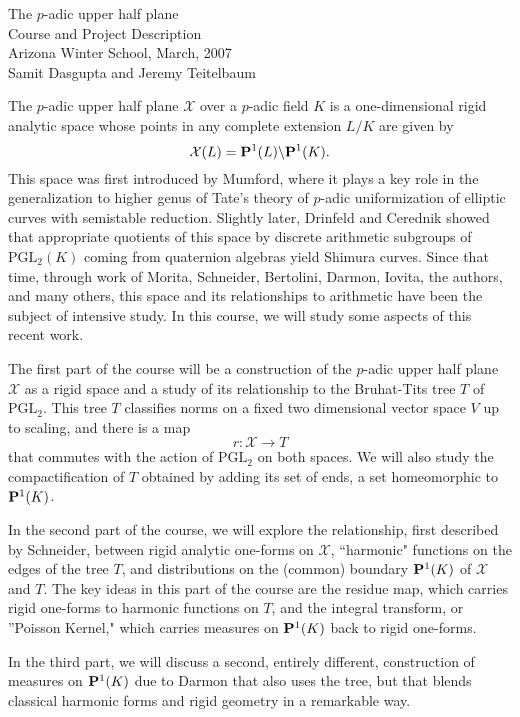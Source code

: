 \documentclass{article}
\def\PGL{\mathrm{PGL}}
\def\X{\mathcal{X}}
\begin{document}
\begin{center}
\Large The $p$-adic upper half plane \\
Course and Project Description \\
Arizona Winter School, March, 2007 \\
 Samit Dasgupta and Jeremy
Teitelbaum
\end{center}
The $p$-adic upper half plane $\X$ over a $p$-adic field $K$ is a
one-dimensional rigid analytic space whose points in any complete
extension $L/K$ are given by
$$
\X(L)={\bf P}^{1}(L)\backslash{\bf P}^{1}(K).
$$
This space was first introduced by Mumford, where it plays a key
role in the generalization to higher genus of Tate's theory of
$p$-adic uniformization of elliptic curves with semistable
reduction.  Slightly later, Drinfeld and Cerednik showed that
appropriate quotients of this space by discrete arithmetic subgroups
of $\PGL_{2}(K)$ coming from quaternion algebras yield Shimura
curves.  Since that time, through work of Morita, Schneider,
Bertolini, Darmon, Iovita, the authors, and many others, this space
and its relationships to arithmetic have been the subject of
intensive study.  In this course, we will study some aspects of this
recent work.

The first part of the course will be a construction of the $p$-adic
upper half plane $\X$ as a rigid space and a study of its
relationship to the Bruhat-Tits tree $T$ of $\PGL_{2}$. This tree
$T$ classifies norms on a fixed two dimensional vector space $V$ up
to scaling, and there is a map
$$ r:\X\to T$$ that commutes with the action of $\PGL_{2}$ on both
spaces.  We will also study the compactification of $T$ obtained by
adding its set of ends, a set homeomorphic to ${\bf P}^{1}(K)$.

In the second part of the course, we will explore the relationship,
first described by Schneider, between rigid analytic one-forms on
$\X$, ``harmonic" functions on the edges of the tree $T$, and
distributions on the (common) boundary ${\bf P}^{1}(K)$ of $\X$ and
$T$.  The key ideas in this part of the course are the residue map,
which carries rigid one-forms to harmonic functions on $T$, and the
integral transform, or ''Poisson Kernel," which carries measures on
${\bf P}^{1}(K)$ back to rigid one-forms.

In the third part, we will discuss a second, entirely different,
construction of measures on ${\bf P}^{1}(K)$ due to Darmon
 that also uses the tree, but that blends classical
harmonic forms and rigid geometry in a remarkable way.
\end{document}
